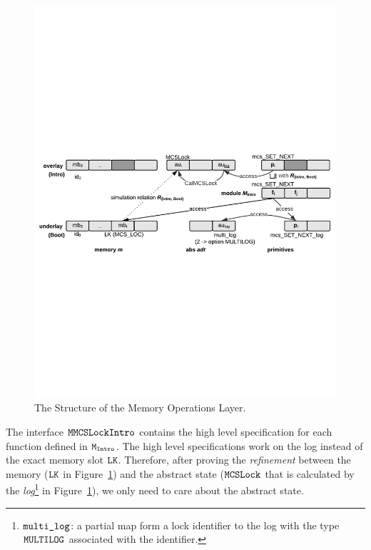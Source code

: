 \begin{figure}
\begin{center}
\includegraphics[width=\linewidth]{figs/mcslock/getsetrefinement}
\end{center}
\caption{The Structure of the Memory Operations Layer.}
\label{fig:chapter:mcslock:layer-struct-mcs-verification}
\end{figure}

The interface ${\mathrm{\texttt{MMCSLockIntro}}}$ contains the high level specification for each function defined in ${\mathrm{\texttt{M}}}_ {{\mathrm{\texttt{Intro}}}}$. 
The high level specifications work on the log instead of the exact memory slot ${\mathrm{\texttt{LK}}}$.
Therefore, after proving the {\em refinement} between the memory (${\mathrm{\texttt{LK}}}$ in Figure~\ref{fig:chapter:mcslock:layer-struct-mcs-verification})
and the abstract state (${\mathrm{\texttt{MCSLock}}}$ that is calculated by the \emph{log}\footnote{${\mathrm{\texttt{multi\_log}}}$: a partial map form a lock identifier to the log with the type ${\mathrm{\texttt{MULTILOG}}}$ associated with the identifier.}
in Figure~\ref{fig:chapter:mcslock:layer-struct-mcs-verification}), we only need to care about the abstract state.


